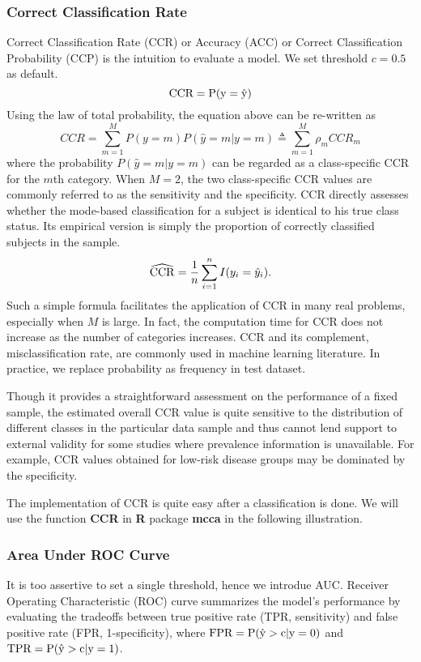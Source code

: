 \documentclass[]{article}
\begin{document}
\subsubsection{Correct Classification Rate}
Correct Classification Rate (CCR) or Accuracy (ACC) or Correct Classification Probability (CCP) is the intuition to evaluate a model. We set threshold $c=0.5$ as default.
\begin{equation}
	\rm CCR=P(y=\hat{y})
\end{equation}
Using the law of total probability, the equation above can be re-written as
\begin{equation}
CCR=\sum_{m=1}^M P(y=m)P(\hat{y}=m|y=m)\triangleq\sum_{m=1}^M \rho_m CCR_m
\end{equation}
where the probability $P(\hat{y}=m|y=m)$ can be regarded as a class-specific CCR for the $m$th category. When $M=2$, the two class-specific CCR values are commonly referred to as the sensitivity and the specificity.
 CCR directly assesses whether the mode-based classification for a subject is identical to his true class status. Its empirical version is simply the proportion of correctly classified subjects in the sample.
\begin{equation}
\widehat{\rm CCR}=\frac{1}{n}\sum_{i=1}^nI(y_i=\hat{y}_i).
\end{equation}
Such a simple formula facilitates the application of CCR in many real problems, especially when $M$ is large. In fact, the computation time for CCR does not increase as the number of categories increases. CCR and its complement, misclassification rate, are commonly used in machine learning literature.
In practice, we replace probability as frequency in test dataset.

Though it provides a straightforward assessment on the performance of a fixed sample, the estimated overall CCR value is quite sensitive to the distribution of different classes in the particular data sample and thus cannot lend support to external validity for some studies where prevalence information is unavailable. For example, CCR values obtained for low-risk disease groups may be dominated by the specificity.

The implementation of CCR is quite easy after a classification is done. We will use the function \textbf{CCR} in \textbf{R} package \textbf{mcca} in the following illustration.

\subsubsection{Area Under ROC Curve}
It is too assertive to set a single threshold, hence we introdue AUC. Receiver Operating Characteristic (ROC) curve summarizes the model’s performance by evaluating the tradeoffs between true positive rate (TPR, sensitivity) and false positive rate (FPR, 1-specificity), where $ \rm FPR=P(\hat{y}>c|y=0) $ and $ \rm TPR=P(\hat{y}>c|y=1) $.
\end{document}
